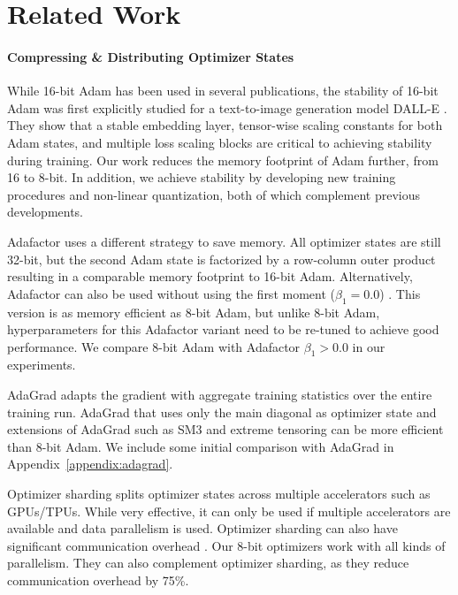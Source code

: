 \section{Related Work}

\paragraph{Compressing \& Distributing Optimizer States} While 16-bit Adam has been used in several publications, the stability of 16-bit Adam was first explicitly studied for a text-to-image generation model DALL-E \citep{ramesh2021zero}. They show that a stable embedding layer, tensor-wise scaling constants for both Adam states, and multiple loss scaling blocks are critical to achieving stability during training. Our work reduces the memory footprint of Adam further, from 16 to 8-bit. In addition, we achieve stability by developing new training procedures and non-linear quantization, both of which complement previous developments.

Adafactor \citep{shazeer2018adafactor} uses a different strategy to save memory. All optimizer states are still 32-bit, but the second Adam state is factorized by a row-column outer product resulting in a comparable memory footprint to 16-bit Adam. Alternatively, Adafactor can also be used without using the first moment ($\beta_1 = 0.0$) \citep{shazeer2018adafactor}. This version is as memory efficient as 8-bit Adam, but unlike 8-bit Adam, hyperparameters for this Adafactor variant need to be re-tuned to achieve good performance. We compare 8-bit Adam with Adafactor $\beta_1 > 0.0$ in our experiments. 

AdaGrad \citep{duchi2011adaptive} adapts the gradient with aggregate training statistics over the entire training run. AdaGrad that uses only the main diagonal as optimizer state and extensions of AdaGrad such as SM3 \citep{anil2019sm3} and extreme tensoring \citep{chen2020extremetensor} can be more efficient than 8-bit Adam. We include some initial comparison with AdaGrad in Appendix~\ref{appendix:adagrad}.

Optimizer sharding \citep{rajbhandari2020zero} splits optimizer states across multiple accelerators such as GPUs/TPUs. While very effective, it can only be used if multiple accelerators are available and data parallelism is used. Optimizer sharding can also have significant communication overhead \citep{rajbhandari2021zero}. Our 8-bit optimizers work with all kinds of parallelism. They can also complement optimizer sharding, as they reduce communication overhead by 75\%. 

